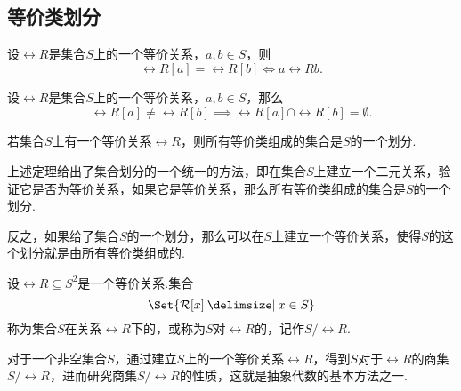 \subsection{等价类划分}
\begin{lemma}
设\(\rel{R}\)是集合\(S\)上的一个等价关系，\(a,b \in S\)，则\[
\rel{R}[a] = \rel{R}[b] \iff a \rel{R} b.
\]
\end{lemma}

\begin{lemma}
设\(\rel{R}\)是集合\(S\)上的一个等价关系，\(a,b \in S\)，那么\[
\rel{R}[a] \neq \rel{R}[b] \implies \rel{R}[a] \cap \rel{R}[b] = \emptyset.
\]
\end{lemma}

\begin{theorem}
若集合\(S\)上有一个等价关系\(\rel{R}\)，则所有等价类组成的集合是\(S\)的一个划分.
\end{theorem}
上述定理给出了集合划分的一个统一的方法，即在集合\(S\)上建立一个二元关系，验证它是否为等价关系，如果它是等价关系，那么所有等价类组成的集合是\(S\)的一个划分.

反之，如果给了集合\(S\)的一个划分，那么可以在\(S\)上建立一个等价关系，使得\(S\)的这个划分就是由所有等价类组成的.

\begin{definition}
设\(\rel{R} \subseteq S^2\)是一个等价关系.集合\[
\Set{\rel{R}[x] \given x \in S}
\]称为集合\(S\)在关系\(\rel{R}\)下的，或称为\(S\)对\(\rel{R}\)的，记作\(S/\rel{R}\).
\end{definition}
对于一个非空集合\(S\)，通过建立\(S\)上的一个等价关系\(\rel{R}\)，得到\(S\)对于\(\rel{R}\)的商集\(S/\rel{R}\)，进而研究商集\(S/\rel{R}\)的性质，这就是抽象代数的基本方法之一.

